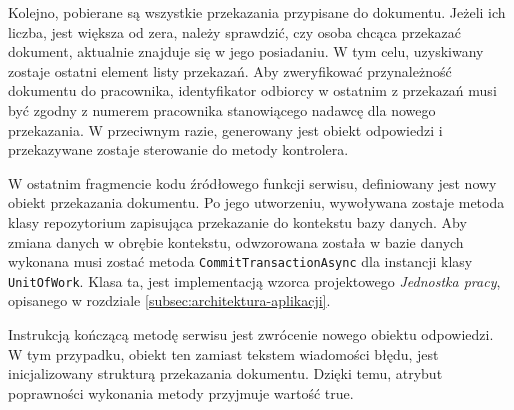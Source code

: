 Kolejno, pobierane są wszystkie przekazania przypisane do dokumentu. Jeżeli ich liczba, jest większa od zera, należy sprawdzić, czy osoba chcąca przekazać dokument, aktualnie znajduje się w jego posiadaniu. W tym celu, uzyskiwany zostaje ostatni element listy przekazań. Aby zweryfikować przynależność dokumentu do pracownika, identyfikator odbiorcy w ostatnim z przekazań musi być zgodny z numerem pracownika stanowiącego nadawcę dla nowego przekazania. W przeciwnym razie, generowany jest obiekt odpowiedzi i przekazywane zostaje sterowanie do metody kontrolera.

W ostatnim fragmencie kodu źródłowego funkcji serwisu, definiowany jest nowy obiekt przekazania dokumentu. Po jego utworzeniu, wywoływana zostaje metoda klasy repozytorium zapisująca przekazanie do kontekstu bazy danych. Aby zmiana danych w obrębie kontekstu, odwzorowana została w bazie danych wykonana musi zostać metoda \texttt{CommitTransactionAsync} dla instancji klasy \texttt{UnitOfWork}. Klasa ta, jest implementacją wzorca projektowego \textit{Jednostka pracy}, opisanego w rozdziale \ref{subsec:architektura-aplikacji}.

Instrukcją kończącą metodę serwisu jest zwrócenie nowego obiektu odpowiedzi. W tym przypadku, obiekt ten zamiast tekstem wiadomości błędu, jest inicjalizowany strukturą przekazania dokumentu. Dzięki temu, atrybut poprawności wykonania metody przyjmuje wartość true.

